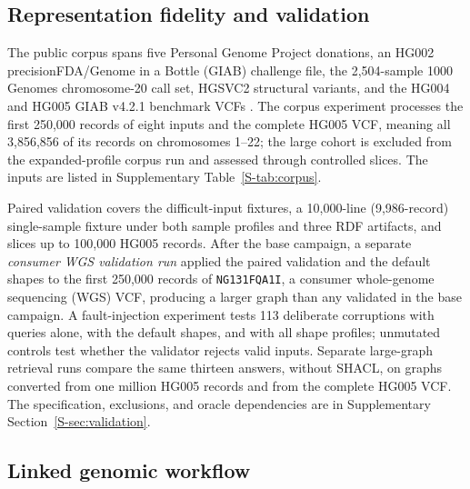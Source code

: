\documentclass[pdflatex,sn-mathphys-num]{sn-jnl}
\begin{document}
\subsection{Representation fidelity and validation}\label{subsec:eval-fidelity}
The public corpus spans five Personal Genome Project donations, an HG002 precisionFDA/Genome in a Bottle (GIAB) challenge file, the 2,504-sample 1000 Genomes chromosome-20 call set, HGSVC2 structural variants, and the HG004 and HG005 GIAB v4.2.1 benchmark VCFs \cite{personal_genome_proj,nist_gib_2025,thousand_genomes_2015,hgsvc_2021,giab_v421_2022}.
The corpus experiment processes the first 250,000 records of eight inputs and the complete HG005 VCF, meaning all 3,856,856 of its records on chromosomes 1--22; the large cohort is excluded from the expanded-profile corpus run and assessed through controlled slices.
The inputs are listed in Supplementary Table~\ref{S-tab:corpus}.

Paired validation covers the difficult-input fixtures, a 10,000-line (9,986-record) single-sample fixture under both sample profiles and three RDF artifacts, and slices up to 100,000 HG005 records.
After the base campaign, a separate \emph{consumer WGS validation run} applied the paired validation and the default shapes to the first 250,000 records of \texttt{NG131FQA1I}, a consumer whole-genome sequencing (WGS) VCF, producing a larger graph than any validated in the base campaign.
A fault-injection experiment tests 113 deliberate corruptions with queries alone, with the default shapes, and with all shape profiles; unmutated controls test whether the validator rejects valid inputs.
Separate large-graph retrieval runs compare the same thirteen answers, without SHACL, on graphs converted from one million HG005 records and from the complete HG005 VCF.
The specification, exclusions, and oracle dependencies are in Supplementary Section~\ref{S-sec:validation}.

\subsection{Linked genomic workflow}\label{subsec:eval-workflow}
\end{document}
